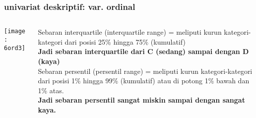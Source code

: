 \documentclass[../main.tex]{subfiles}
\begin{document}
\begin{frame}[label=one,mybg=bg3,mytitle=standard,light]%

	\frametitle{univariat deskriptif: var. ordinal}
	\begin{columns}
		\begin{column}{0.5\textwidth}
			\texttt{[image: 6ord3]}
		\end{column}
		\begin{column}{0.5\textwidth}
			Sebaran interquartile (interquartile range) = meliputi kurun kategori-kategori dari posisi 25\% hingga 75\% (kumulatif)\\

			\textbf{Jadi sebaran interquartile dari C (sedang) sampai dengan D (kaya)}\\
			Sebaran persentil (persentil range) = meliputi kurun kategori-kategori dari posisi 1\% hingga 99\% (kumulatif) atau di potong 1\% bawah dan 1\% atas.\\

			\textbf{Jadi sebaran persentil sangat miskin sampai dengan sangat kaya.}

		\end{column}
	\end{columns}

\end{frame}
\end{document}
